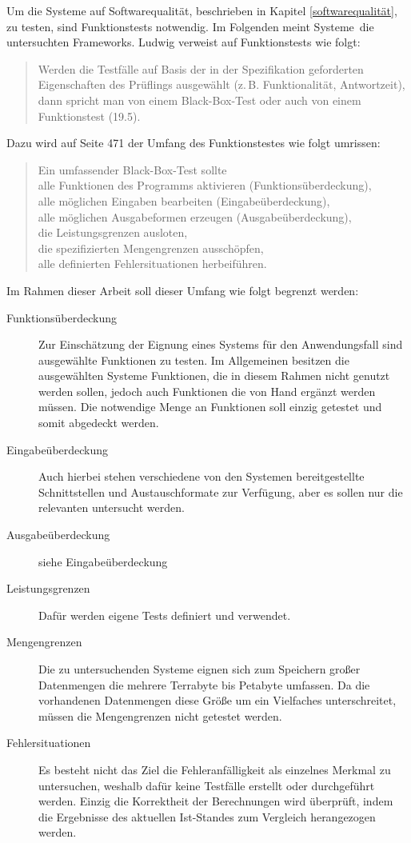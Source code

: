 \label{grundlagen-funktionstests}
Um die Systeme auf Softwarequalität, beschrieben in Kapitel \ref{softwarequalität}, zu testen, sind Funktionstests notwendig.
Im Folgenden meint \glqq Systeme\grqq\ die untersuchten Frameworks.
Ludwig verweist auf Funktionstests wie folgt:
\begin{quote}
Werden die Testfälle auf Basis der in der Spezifikation geforderten Eigenschaften des Prüflings ausgewählt (z.\,B. Funktionalität, Antwortzeit), dann spricht man von einem Black-Box-Test oder auch von einem Funktionstest (19.5). \cite[S.455]{book:softwareengineering}
\end{quote}
Dazu wird auf Seite 471 der Umfang des Funktionstestes wie folgt umrissen:
\begin{quote}
Ein umfassender Black-Box-Test sollte\\
alle Funktionen des Programms aktivieren (Funktionsüberdeckung),\\
alle möglichen Eingaben bearbeiten (Eingabeüberdeckung),\\
alle möglichen Ausgabeformen erzeugen (Ausgabeüberdeckung),\\
die Leistungsgrenzen ausloten,\\
die spezifizierten Mengengrenzen ausschöpfen,\\
alle definierten Fehlersituationen herbeiführen.
\end{quote}
Im Rahmen dieser Arbeit soll dieser Umfang wie folgt begrenzt werden:
\begin{description}
\item[Funktionsüberdeckung] Zur Einschätzung der Eignung eines Systems für den Anwendungsfall sind ausgewählte Funktionen zu testen. Im Allgemeinen besitzen die ausgewählten Systeme Funktionen, die in diesem Rahmen nicht genutzt werden sollen, jedoch auch Funktionen die von Hand ergänzt werden müssen. Die notwendige Menge an Funktionen soll einzig getestet und somit abgedeckt werden.
\item[Eingabeüberdeckung] Auch hierbei stehen verschiedene von den Systemen bereitgestellte Schnittstellen und Austauschformate zur Verfügung, aber es sollen nur die relevanten untersucht werden.
\item[Ausgabeüberdeckung] siehe Eingabeüberdeckung
\item[Leistungsgrenzen] Dafür werden eigene Tests definiert und verwendet.
\item[Mengengrenzen] Die zu untersuchenden Systeme eignen sich zum Speichern großer Datenmengen die mehrere Terrabyte bis Petabyte umfassen. Da die vorhandenen Datenmengen diese Größe um ein Vielfaches unterschreitet, müssen die Mengengrenzen nicht getestet werden.
\item[Fehlersituationen] Es besteht nicht das Ziel die Fehleranfälligkeit als einzelnes Merkmal zu untersuchen, weshalb dafür keine Testfälle erstellt oder durchgeführt werden. Einzig die Korrektheit der Berechnungen wird überprüft, indem die Ergebnisse des aktuellen Ist-Standes zum Vergleich herangezogen werden. 
\end{description}

